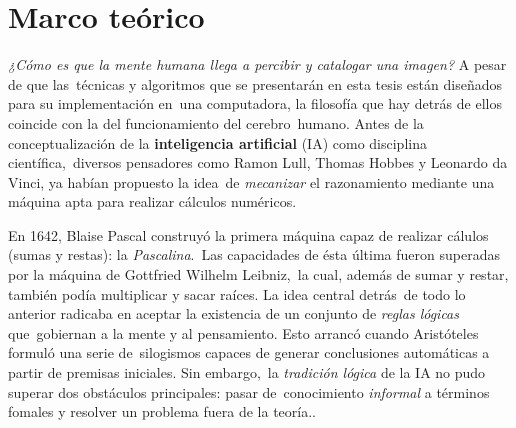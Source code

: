\chapter{Marco teórico}

\noindent
\emph{¿Cómo es que la mente humana llega a percibir y catalogar una imagen?} A pesar de que las\
técnicas y algoritmos que se presentarán en esta tesis están diseñados para su implementación en\
una computadora, la filosofía que hay detrás de ellos coincide con la del funcionamiento del cerebro\
humano. Antes de la conceptualización de la \textbf{inteligencia artificial} (IA) como disciplina científica,\
diversos pensadores como Ramon Lull, Thomas Hobbes y Leonardo da Vinci, ya habían propuesto la idea\
de \emph{mecanizar} el razonamiento mediante una máquina apta para realizar cálculos numéricos. \cite{russell2010}\par
En 1642, Blaise Pascal construyó la primera máquina capaz de realizar cálulos (sumas y restas): la \emph{Pascalina}.\
Las capacidades de ésta última fueron superadas por la máquina de Gottfried Wilhelm Leibniz,\
la cual, además de sumar y restar, también podía multiplicar y sacar raíces. La idea central detrás\
de todo lo anterior radicaba en aceptar la existencia de un conjunto de \emph{reglas lógicas} que\
gobiernan a la mente y al pensamiento. Esto arrancó cuando Aristóteles formuló una serie de\
silogismos capaces de generar conclusiones automáticas a partir de premisas iniciales. Sin embargo,\
la \emph{tradición lógica} de la IA no pudo superar dos obstáculos principales: pasar de\
conocimiento \emph{informal} a términos fomales y resolver un problema fuera de la teoría.\cite{russell2010}.\par







